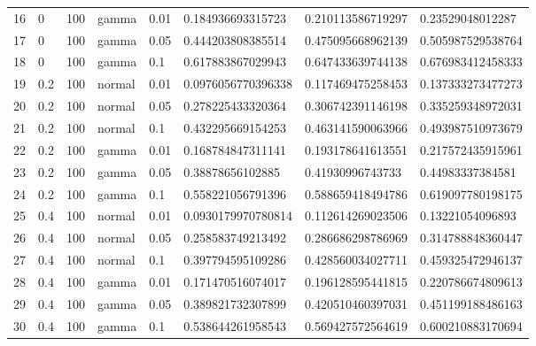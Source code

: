 \begin{table}[ht]
\begin{tabular}{rlllllll}
  16 & 0 & 100 & gamma & 0.01 & 0.184936693315723 & 0.210113586719297 & 0.23529048012287 \\ 
  17 & 0 & 100 & gamma & 0.05 & 0.444203808385514 & 0.475095668962139 & 0.505987529538764 \\ 
  18 & 0 & 100 & gamma & 0.1 & 0.617883867029943 & 0.647433639744138 & 0.676983412458333 \\ 
  19 & 0.2 & 100 & normal & 0.01 & 0.0976056770396338 & 0.117469475258453 & 0.137333273477273 \\ 
  20 & 0.2 & 100 & normal & 0.05 & 0.278225433320364 & 0.306742391146198 & 0.335259348972031 \\ 
  21 & 0.2 & 100 & normal & 0.1 & 0.432295669154253 & 0.463141590063966 & 0.493987510973679 \\ 
  22 & 0.2 & 100 & gamma & 0.01 & 0.168784847311141 & 0.193178641613551 & 0.217572435915961 \\ 
  23 & 0.2 & 100 & gamma & 0.05 & 0.38878656102885 & 0.41930996743733 & 0.44983337384581 \\ 
  24 & 0.2 & 100 & gamma & 0.1 & 0.558221056791396 & 0.588659418494786 & 0.619097780198175 \\ 
  25 & 0.4 & 100 & normal & 0.01 & 0.0930179970780814 & 0.112614269023506 & 0.13221054096893 \\ 
  26 & 0.4 & 100 & normal & 0.05 & 0.258583749213492 & 0.286686298786969 & 0.314788848360447 \\ 
  27 & 0.4 & 100 & normal & 0.1 & 0.397794595109286 & 0.428560034027711 & 0.459325472946137 \\ 
  28 & 0.4 & 100 & gamma & 0.01 & 0.171470516074017 & 0.196128595441815 & 0.220786674809613 \\ 
  29 & 0.4 & 100 & gamma & 0.05 & 0.389821732307899 & 0.420510460397031 & 0.451199188486163 \\ 
  30 & 0.4 & 100 & gamma & 0.1 & 0.538644261958543 & 0.569427572564619 & 0.600210883170694 \\ 
   \hline
\end{tabular}
\end{table}

